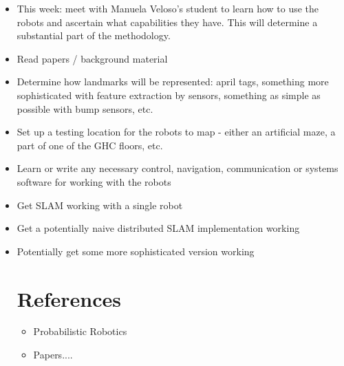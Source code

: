 \documentclass[11pt]{article}
\begin{document}
\begin{itemize}
    \item This week: meet with Manuela Veloso's student to learn how to use the robots and ascertain what capabilities they have.  This will determine a substantial part of the methodology.
    \item Read papers / background material
    \item Determine how landmarks will be represented: april tags, something more sophisticated with feature extraction by sensors, something as simple as possible with bump sensors, etc.
    \item Set up a testing location for the robots to map - either an artificial maze, a part of one of the GHC floors, etc.
    \item Learn or write any necessary control, navigation, communication or systems software for working with the robots
    \item Get SLAM working with a single robot
    \item Get a potentially naive distributed SLAM implementation working
    \item Potentially get some more sophisticated version working

        \section{References}
\begin{itemize}
    \item Probabilistic Robotics
    \item Papers....

\end{itemize}

\end{itemize}
\end{document}
